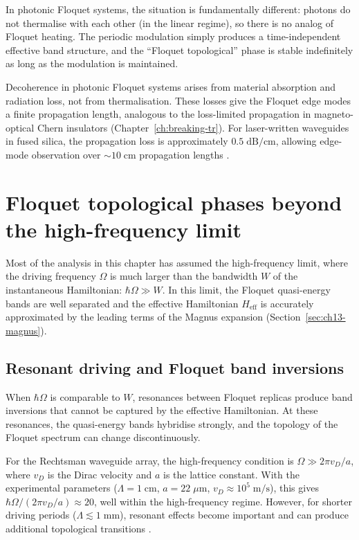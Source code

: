 In photonic Floquet systems, the situation is fundamentally different:
photons do not thermalise with each other (in the linear regime), so
there is no analog of Floquet heating.  The periodic modulation
simply produces a time-independent effective band structure, and the
``Floquet topological'' phase is stable indefinitely as long as the
modulation is maintained.

Decoherence in photonic Floquet systems arises from material
absorption and radiation loss, not from thermalisation.  These losses
give the Floquet edge modes a finite propagation length, analogous to
the loss-limited propagation in magneto-optical Chern insulators
(Chapter~\ref{ch:breaking-tr}).  For laser-written waveguides in fused
silica, the propagation loss is approximately
$0.5\;\mathrm{dB/cm}$, allowing edge-mode observation over
$\sim 10\;\mathrm{cm}$ propagation lengths
\cite{rechtsman2013photonica,price2022roadmap}.

\section{Floquet topological phases beyond the high-frequency limit}
\label{sec:ch13-beyond-high-freq}

Most of the analysis in this chapter has assumed the high-frequency
limit, where the driving frequency $\Omega$ is much larger than the
bandwidth $W$ of the instantaneous Hamiltonian: $\hbar\Omega\gg W$.
In this limit, the Floquet quasi-energy bands are well separated and
the effective Hamiltonian $H_{\mathrm{eff}}$ is accurately
approximated by the leading terms of the Magnus expansion
(Section~\ref{sec:ch13-magnus}).

\subsection{Resonant driving and Floquet band inversions}
\label{sec:ch13-resonant}

When $\hbar\Omega$ is comparable to $W$, resonances between Floquet
replicas produce band inversions that cannot be captured by the
effective Hamiltonian.  At these resonances, the quasi-energy bands
hybridise strongly, and the topology of the Floquet spectrum can
change discontinuously.

For the Rechtsman waveguide array, the high-frequency condition is
$\Omega\gg 2\pi v_D/a$, where $v_D$ is the Dirac velocity and $a$
is the lattice constant.  With the experimental parameters
($\Lambda=1\;\mathrm{cm}$, $a=22\;\mu\mathrm{m}$, $v_D\approx 10^5
\;\mathrm{m/s}$), this gives $\hbar\Omega/(2\pi v_D/a)\approx 20$,
well within the high-frequency regime.  However, for shorter driving
periods ($\Lambda\lesssim 1\;\mathrm{mm}$), resonant effects become
important and can produce additional topological transitions
\cite{rechtsman2013photonica,kitagawa2010topological}.

